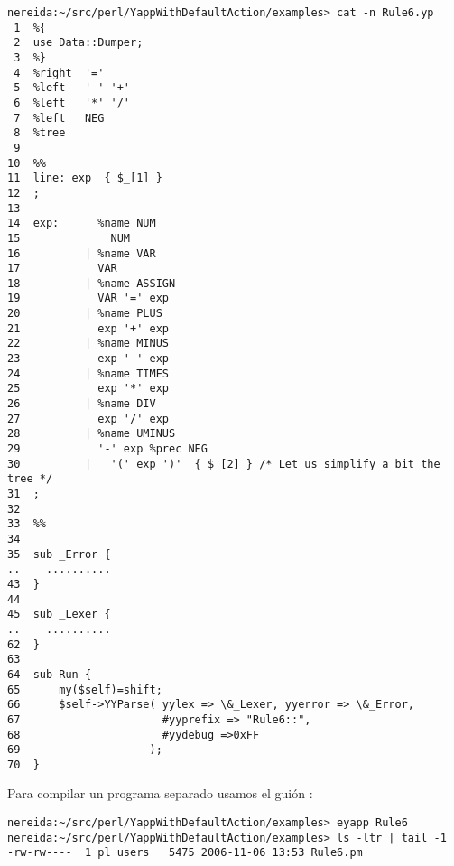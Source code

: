 \label{code:eyapprule6}
\begin{verbatim}
nereida:~/src/perl/YappWithDefaultAction/examples> cat -n Rule6.yp
 1  %{
 2  use Data::Dumper;
 3  %}
 4  %right  '='
 5  %left   '-' '+'
 6  %left   '*' '/'
 7  %left   NEG
 8  %tree
 9
10  %%
11  line: exp  { $_[1] }
12  ;
13
14  exp:      %name NUM
15              NUM
16          | %name VAR
17            VAR
18          | %name ASSIGN
19            VAR '=' exp
20          | %name PLUS
21            exp '+' exp
22          | %name MINUS
23            exp '-' exp
24          | %name TIMES
25            exp '*' exp
26          | %name DIV
27            exp '/' exp
28          | %name UMINUS
29            '-' exp %prec NEG
30          |   '(' exp ')'  { $_[2] } /* Let us simplify a bit the tree */
31  ;
32
33  %%
34
35  sub _Error {
..    ..........
43  }
44
45  sub _Lexer {
..    ..........
62  }
63
64  sub Run {
65      my($self)=shift;
66      $self->YYParse( yylex => \&_Lexer, yyerror => \&_Error,
67                      #yyprefix => "Rule6::",
68                      #yydebug =>0xFF
69                    );
70  }
\end{verbatim}



Para compilar un programa separado  usamos el guión :
\begin{verbatim}
nereida:~/src/perl/YappWithDefaultAction/examples> eyapp Rule6
nereida:~/src/perl/YappWithDefaultAction/examples> ls -ltr | tail -1
-rw-rw----  1 pl users   5475 2006-11-06 13:53 Rule6.pm
\end{verbatim}


